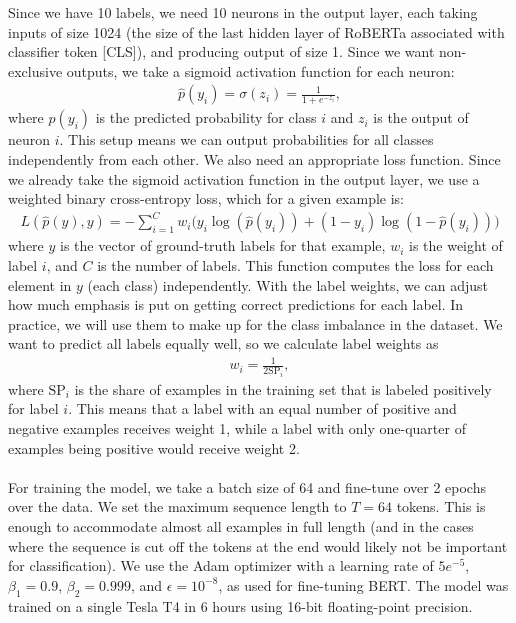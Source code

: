 Since we have 10 labels, we need 10 neurons in the output layer, each taking inputs of size 1024 (the size of the last hidden layer of RoBERTa associated with classifier token [CLS]), and producing output of size 1. Since we want non-exclusive outputs, we take a sigmoid activation function for each neuron:
\begin{gather*}
    \hat{p}(y_i)=\sigma(z_i)=\frac{1}{1+e^{-z_i}},
\end{gather*}
where $\hat{p}(y_i)$ is the predicted probability for class $i$ and $z_i$ is the output of neuron $i$. This setup means we can output probabilities for all classes independently from each other. We also need an appropriate loss function. Since we already take the sigmoid activation function in the output layer, we use a weighted binary cross-entropy loss, which for a given example is:
\begin{gather*}
    L(\hat{p}(y),y) = - \sum_{i=1}^{C} w_i \big( y_i \log(\hat{p}(y_i)) + (1-y_i) \log(1-\hat{p}(y_i)) \big)
\end{gather*}
where $y$ is the vector of ground-truth labels for that example, $w_i$ is the weight of label $i$, and $C$ is the number of labels. This function computes the loss for each element in $y$ (each class) independently. With the label weights, we can adjust how much emphasis is put on getting correct predictions for each label. In practice, we will use them to make up for the class imbalance in the dataset. We want to predict all labels equally well, so we calculate label weights as
\begin{gather*}
    w_i = \frac{1}{2 \text{SP}_i},
\end{gather*}
where $\text{SP}_i$ is the share of examples in the training set that is labeled positively for label $i$. This means that a label with an equal number of positive and negative examples receives weight 1, while a label with only one-quarter of examples being positive would receive weight 2. \\\\
For training the model, we take a batch size of 64 and fine-tune over 2 epochs over the data. We set the maximum sequence length to $T=64$ tokens. This is enough to accommodate almost all examples in full length (and in the cases where the sequence is cut off the tokens at the end would likely not be important for classification). We use the Adam optimizer \citep{kingma2014adam} with a learning rate of $5e^{-5}$, $\beta_1=0.9$, $\beta_2=0.999$, and $\epsilon=10^{-8}$, as \citet{devlin2018bert} used for fine-tuning BERT. The model was trained on a single Tesla T4 in 6 hours using 16-bit floating-point precision.

